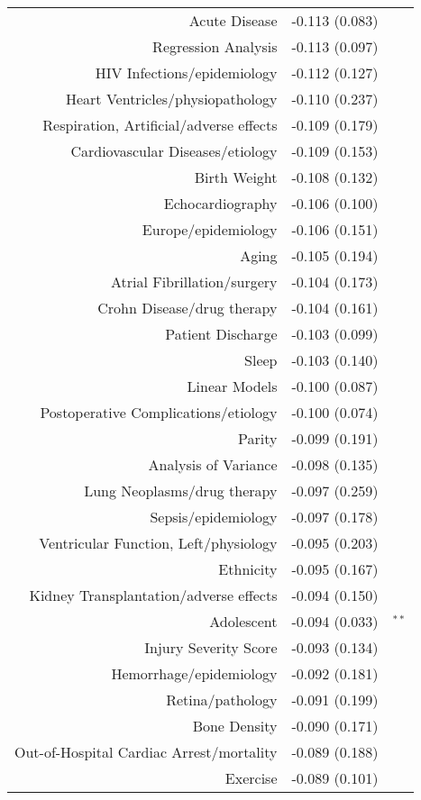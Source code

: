 \begin{longtable}[l]{rr@{}l@{ }}
Acute Disease & -0.113 (0.083) & $^{}$\\
Regression Analysis & -0.113 (0.097) & $^{}$\\
HIV Infections/epidemiology & -0.112 (0.127) & $^{}$\\
Heart Ventricles/physiopathology & -0.110 (0.237) & $^{}$\\
Respiration, Artificial/adverse effects & -0.109 (0.179) & $^{}$\\
Cardiovascular Diseases/etiology & -0.109 (0.153) & $^{}$\\
Birth Weight & -0.108 (0.132) & $^{}$\\
Echocardiography & -0.106 (0.100) & $^{}$\\
Europe/epidemiology & -0.106 (0.151) & $^{}$\\
Aging & -0.105 (0.194) & $^{}$\\
Atrial Fibrillation/surgery & -0.104 (0.173) & $^{}$\\
Crohn Disease/drug therapy & -0.104 (0.161) & $^{}$\\
Patient Discharge & -0.103 (0.099) & $^{}$\\
Sleep & -0.103 (0.140) & $^{}$\\
Linear Models & -0.100 (0.087) & $^{}$\\
Postoperative Complications/etiology & -0.100 (0.074) & $^{}$\\
Parity & -0.099 (0.191) & $^{}$\\
Analysis of Variance & -0.098 (0.135) & $^{}$\\
Lung Neoplasms/drug therapy & -0.097 (0.259) & $^{}$\\
Sepsis/epidemiology & -0.097 (0.178) & $^{}$\\
Ventricular Function, Left/physiology & -0.095 (0.203) & $^{}$\\
Ethnicity & -0.095 (0.167) & $^{}$\\
Kidney Transplantation/adverse effects & -0.094 (0.150) & $^{}$\\
Adolescent & -0.094 (0.033) & $^{**}$\\
Injury Severity Score & -0.093 (0.134) & $^{}$\\
Hemorrhage/epidemiology & -0.092 (0.181) & $^{}$\\
Retina/pathology & -0.091 (0.199) & $^{}$\\
Bone Density & -0.090 (0.171) & $^{}$\\
Out-of-Hospital Cardiac Arrest/mortality & -0.089 (0.188) & $^{}$\\
Exercise & -0.089 (0.101) & $^{}$\\

\end{longtable}

